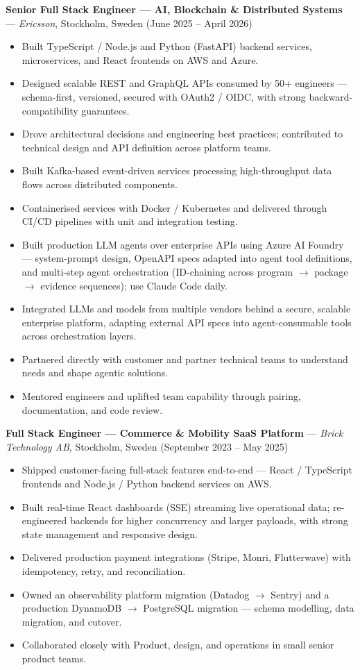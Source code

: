 \documentclass[11pt,a4paper]{article}
\newcommand{\role}[4]{%
  \noindent\textbf{#1} --- \textit{#2}, #4 (#3)\\[0.2em]
}
\begin{document}
\role{Senior Full Stack Engineer --- AI, Blockchain \& Distributed Systems}{Ericsson}{June 2025 -- April 2026}{Stockholm, Sweden}
\begin{itemize}
  \item Built TypeScript / Node.js and Python (FastAPI) backend services, microservices, and React frontends on AWS and Azure.
  \item Designed scalable REST and GraphQL APIs consumed by 50+ engineers --- schema-first, versioned, secured with OAuth2 / OIDC, with strong backward-compatibility guarantees.
  \item Drove architectural decisions and engineering best practices; contributed to technical design and API definition across platform teams.
  \item Built Kafka-based event-driven services processing high-throughput data flows across distributed components.
  \item Containerised services with Docker / Kubernetes and delivered through CI/CD pipelines with unit and integration testing.
  \item Built production LLM agents over enterprise APIs using Azure AI Foundry --- system-prompt design, OpenAPI specs adapted into agent tool definitions, and multi-step agent orchestration (ID-chaining across program \(\to\) package \(\to\) evidence sequences); use Claude Code daily.
  \item Integrated LLMs and models from multiple vendors behind a secure, scalable enterprise platform, adapting external API specs into agent-consumable tools across orchestration layers.
  \item Partnered directly with customer and partner technical teams to understand needs and shape agentic solutions.
  \item Mentored engineers and uplifted team capability through pairing, documentation, and code review.
\end{itemize}

\role{Full Stack Engineer --- Commerce \& Mobility SaaS Platform}{Brick Technology AB}{September 2023 -- May 2025}{Stockholm, Sweden}
\begin{itemize}
  \item Shipped customer-facing full-stack features end-to-end --- React / TypeScript frontends and Node.js / Python backend services on AWS.
  \item Built real-time React dashboards (SSE) streaming live operational data; re-engineered backends for higher concurrency and larger payloads, with strong state management and responsive design.
  \item Delivered production payment integrations (Stripe, Monri, Flutterwave) with idempotency, retry, and reconciliation.
  \item Owned an observability platform migration (Datadog \(\to\) Sentry) and a production DynamoDB \(\to\) PostgreSQL migration --- schema modelling, data migration, and cutover.
  \item Collaborated closely with Product, design, and operations in small senior product teams.
\end{itemize}
\end{document}
